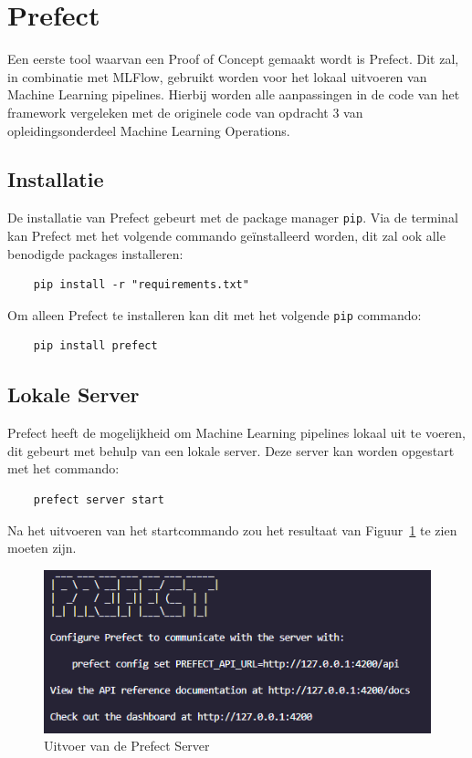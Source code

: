 
\section{Prefect}

Een eerste tool waarvan een Proof of Concept gemaakt wordt is Prefect. Dit zal, in combinatie met MLFlow, gebruikt worden voor het lokaal uitvoeren van Machine Learning pipelines. Hierbij worden alle aanpassingen in de code van het framework vergeleken met de originele code van opdracht 3 van opleidingsonderdeel Machine Learning Operations.

\subsection{Installatie}

De installatie van Prefect gebeurt met de package manager \texttt{pip}. Via de terminal kan Prefect met het volgende commando geïnstalleerd worden, dit zal ook alle benodigde packages installeren:


\begin{verbatim}
    pip install -r "requirements.txt"
\end{verbatim}

Om alleen Prefect te installeren kan dit met het volgende \texttt{pip} commando:

\begin{verbatim}
    pip install prefect
\end{verbatim}

\subsection{Lokale Server}

Prefect heeft de mogelijkheid om Machine Learning pipelines lokaal uit te voeren, dit gebeurt met behulp van een lokale server. Deze server kan worden opgestart met het commando:

\begin{verbatim}
    prefect server start
\end{verbatim}

Na het uitvoeren van het startcommando zou het resultaat van Figuur~\ref{fig:Prefect_server} te zien moeten zijn.
\begin{figure}
    \centering
    \includegraphics[width=0.9\linewidth]{graphics/Prefect_server.PNG}
    \caption{Uitvoer van de Prefect Server}
    \label{fig:Prefect_server}
\end{figure}

